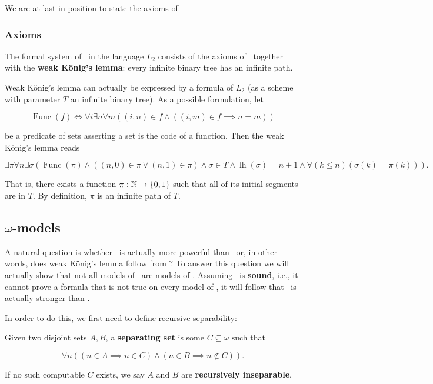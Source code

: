 \documentclass[../main.tex]{memoir}
\begin{document}
We are at last in position to state the axioms of \wkl

\subsubsection{Axioms}

\begin{definition}
  The formal system of \wkl\ in the language $L_2$ consists of the axioms of \rca\ together with the \textbf{weak König's lemma}: every infinite binary tree has an infinite path.
\end{definition}

\begin{remark}
  \label{remark:wkl-formalization}
  Weak König's lemma can actually be expressed by a formula of $L_2$ (as a scheme with parameter $T$ an infinite binary tree). As a possible formulation, let

  \[ \operatorname{Func}(f) \iff \forall i \exists n \forall m ((i, n) \in f \land ((i, m) \in f \implies n = m)) \]

  be a predicate of sets asserting a set is the code of a function. Then the weak König's lemma reads

  \[ \exists \pi \forall n \exists \sigma (\operatorname{Func}(\pi) \land ((n, 0) \in \pi \lor (n, 1) \in \pi) \land \sigma \in T \land \operatorname{lh}(\sigma) = n + 1 \land \forall(k \le n) (\sigma(k) = \pi(k))). \]

  That is, there exists a function $\pi: \mathbb{N} \to \{0, 1\}$ such that all of its initial segments are in $T$. By definition, $\pi$ is an infinite path of $T$.
\end{remark}

\subsection{$\omega$-models}

A natural question is whether \wkl\ is actually more powerful than \rca\ or, in other words, does weak König's lemma follow from \rca? To answer this question we will actually show that not all models of \rca\ are models of \wkl. Assuming \rca\ is \textbf{sound}, i.e., it cannot prove a formula that is not true on every model of \rca, it will follow that \wkl\ is actually stronger than \rca.

In order to do this, we first need to define recursive separability:

\begin{definition}
  Given two disjoint sets $A, B$, a \textbf{separating set} is some $C \subseteq \omega$ such that

  \[ \forall n ((n \in A \implies n \in C) \land (n \in B \implies n \not\in C)). \]

  If no such computable $C$ exists, we say $A$ and $B$ are \textbf{recursively inseparable}.
\end{definition}
\end{document}
